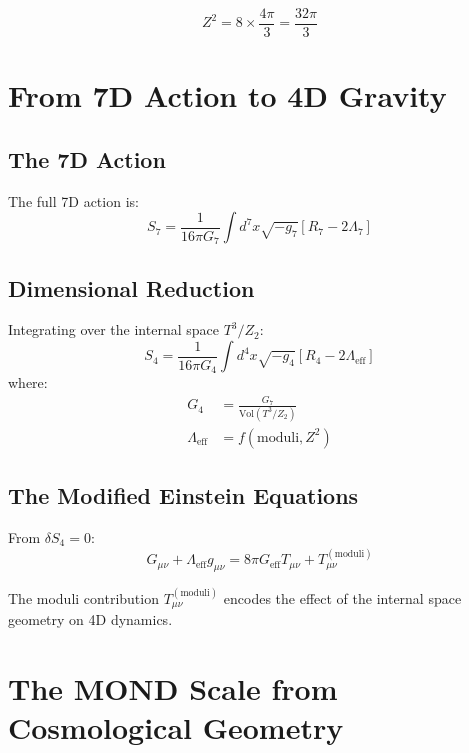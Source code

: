 \documentclass[12pt,a4paper]{article}
\begin{document}
\begin{equation}
Z^2 = 8 \times \frac{4\pi}{3} = \frac{32\pi}{3}
\end{equation}

\section{From 7D Action to 4D Gravity}

\subsection{The 7D Action}

The full 7D action is:
\begin{equation}
S_7 = \frac{1}{16\pi G_7} \int d^7x \sqrt{-g_7} \left[ R_7 - 2\Lambda_7 \right]
\end{equation}

\subsection{Dimensional Reduction}

Integrating over the internal space $T^3/Z_2$:
\begin{equation}
S_4 = \frac{1}{16\pi G_4} \int d^4x \sqrt{-g_4} \left[ R_4 - 2\Lambda_{\text{eff}} \right]
\end{equation}
where:
\begin{align}
G_4 &= \frac{G_7}{\text{Vol}(T^3/Z_2)} \\
\Lambda_{\text{eff}} &= f(\text{moduli}, Z^2)
\end{align}

\subsection{The Modified Einstein Equations}

From $\delta S_4 = 0$:
\begin{equation}
G_{\mu\nu} + \Lambda_{\text{eff}} g_{\mu\nu} = 8\pi G_{\text{eff}} T_{\mu\nu} + T_{\mu\nu}^{(\text{moduli})}
\end{equation}

The moduli contribution $T_{\mu\nu}^{(\text{moduli})}$ encodes the effect of the internal space geometry on 4D dynamics.

\section{The MOND Scale from Cosmological Geometry}
\end{document}
